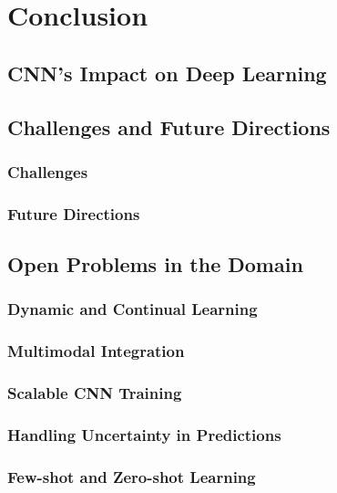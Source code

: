 \chapter{Conclusion}\label{chp:8}
\section{CNN’s Impact on Deep Learning}
\section{Challenges and Future Directions}
\subsection{Challenges}
\subsection{Future Directions}

\section{Open Problems in the Domain}
\subsection{Dynamic and Continual Learning}
\subsection{Multimodal Integration}
\subsection{Scalable CNN Training}
\subsection{Handling Uncertainty in Predictions}
\subsection{Few-shot and Zero-shot Learning}